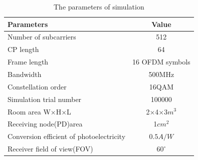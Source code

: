 \documentclass[journal]{IEEEtran}
\begin{document}
    \begin{table} [htb]
        \caption{The parameters of simulation}
         \centering\begin{tabular}{lc}
                    \hline
                    Parameters & Value\\
                    \hline
                    Number of subcarriers & 512 \\
                    CP length & 64\\
                    Frame length & 16 OFDM symbols\\
                    Bandwidth & 500MHz \\
                    Constellation order & 16QAM \\
                    Simulation trial number & 100000 \\
                    Room area W$\times$H$\times$L & 2$\times$4$\times$3$m^3$\\
                    Receiving node(PD)area & 1$cm^2$ \\
                    Conversion efficient of photoelectricity & $0.5A/W$ \\
                    Receiver field of view(FOV) & $60^{\circ}$ \\
                    \hline
                    \end{tabular}
    \end{table}
\end{document}
